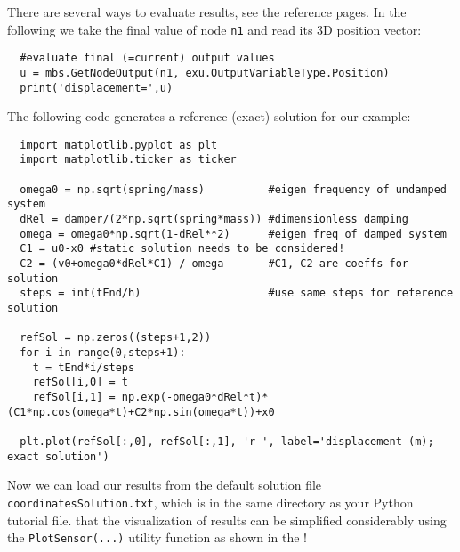 There are several ways to evaluate results, see the reference pages. In the following we take the final value of node \texttt{n1} and read its 3D position vector:
\pythonstyle\begin{lstlisting}
  #evaluate final (=current) output values
  u = mbs.GetNodeOutput(n1, exu.OutputVariableType.Position)
  print('displacement=',u)
\end{lstlisting}
%
The following code generates a reference (exact) solution for our example:
\pythonstyle\begin{lstlisting}
  import matplotlib.pyplot as plt
  import matplotlib.ticker as ticker

  omega0 = np.sqrt(spring/mass)          #eigen frequency of undamped system
  dRel = damper/(2*np.sqrt(spring*mass)) #dimensionless damping
  omega = omega0*np.sqrt(1-dRel**2)      #eigen freq of damped system
  C1 = u0-x0 #static solution needs to be considered!
  C2 = (v0+omega0*dRel*C1) / omega       #C1, C2 are coeffs for solution
  steps = int(tEnd/h)                    #use same steps for reference solution

  refSol = np.zeros((steps+1,2))
  for i in range(0,steps+1):
    t = tEnd*i/steps
    refSol[i,0] = t
    refSol[i,1] = np.exp(-omega0*dRel*t)*(C1*np.cos(omega*t)+C2*np.sin(omega*t))+x0

  plt.plot(refSol[:,0], refSol[:,1], 'r-', label='displacement (m); exact solution')
\end{lstlisting}
%
Now we can load our results from the default solution file \texttt{coordinatesSolution.txt}, which is in the same
directory as your Python tutorial file. 
 that the visualization of results can be simplified considerably using the \texttt{PlotSensor(...)} utility function as shown in the !

